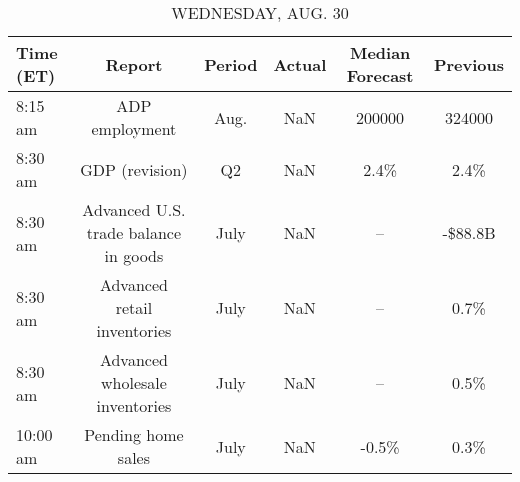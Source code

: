 \documentclass{article}%
\begin{document}
\begin{table}[htbp]%
\caption{WEDNESDAY, AUG. 30}%
\centering%
\begin{adjustbox}{width=1\textwidth}%
\begin{tabular}{lccccc}
\toprule
Time (ET) &                               Report & Period & Actual & Median Forecast & Previous \\
\midrule
  8:15 am &                       ADP employment &   Aug. &    NaN &          200000 &   324000 \\
  8:30 am &                       GDP (revision) &     Q2 &    NaN &            2.4\% &     2.4\% \\
  8:30 am & Advanced U.S. trade balance in goods &   July &    NaN &              -- &  -\$88.8B \\
  8:30 am &          Advanced retail inventories &   July &    NaN &              -- &     0.7\% \\
  8:30 am &       Advanced wholesale inventories &   July &    NaN &              -- &     0.5\% \\
 10:00 am &                   Pending home sales &   July &    NaN &           -0.5\% &     0.3\% \\
\bottomrule
\end{tabular}
%
\end{adjustbox}%
\end{table}

%
\end{document}
